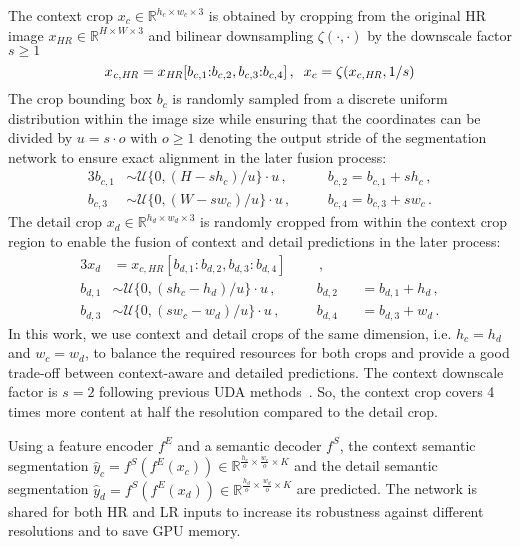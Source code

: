 \documentclass[journal,compsoc]{IEEEtran}
\begin{document}
The context crop $x_c \in \mathbb{R}^{h_c \times w_c \times 3}$ is obtained by cropping from the original HR image $x_\mathit{HR} \in \mathbb{R}^{H \times W \times 3}$ and bilinear downsampling $\zeta(\cdot, \cdot)$ by the downscale factor $s \geq 1$
\begin{equation}
    x_{\mathit{c,HR}} = x_\mathit{HR}[b_{c,1} {:} b_{c,2}, b_{c,3} {:} b_{c,4}]\,, \hspace{2mm} x_c = \zeta(x_{c,\mathit{HR}}, 1/s)
    \label{eq:x_c}
\end{equation}
The crop bounding box $b_c$ is randomly sampled from a discrete uniform distribution within the image size while ensuring that the coordinates can be divided by $u=s \cdot o$ with $o \geq 1$ denoting the output stride of the segmentation network to ensure exact alignment in the later fusion process:
\begin{alignat}{3}
    b_{c,1} &\sim \mathcal{U}\{0, (H-sh_c) / u\} \cdot u\,,\quad &&b_{c,2} = b_{c,1} + sh_c\,,\\ 
    b_{c,3} &\sim \mathcal{U}\{0, (W-sw_c) / u\} \cdot u\,,\quad &&b_{c,4} = b_{c,3} + sw_c\,.\nonumber
\end{alignat}
The detail crop $x_d \in \mathbb{R}^{h_d \times w_d \times 3}$ is randomly cropped from within the context crop region to enable the fusion of context and detail predictions in the later process:
\begin{alignat}{3}
    x_d &= x_\mathit{c,HR}[b_{d,1} : b_{d,2}, b_{d,3} : b_{d,4}] &&\,,\label{eq:x_d}\\
    b_{d,1} &\sim \mathcal{U}\{0, (sh_c-h_d) / u\} \cdot u\,,\quad &&b_{d,2} &&= b_{d,1} + h_d\,,\\ 
    b_{d,3} &\sim \mathcal{U}\{0, (sw_c-w_d) / u\} \cdot u\,,\quad &&b_{d,4} &&= b_{d,3} + w_d\,.\nonumber
\end{alignat}
In this work, we use context and detail crops of the same dimension, i.e. $h_c{=}h_d$ and $w_c{=}w_d$, to balance the required resources for both crops and provide a good trade-off between context-aware and detailed predictions. The context downscale factor is $s{=}2$ following previous UDA methods~\cite{tsai2018learning,tranheden2021dacs}. So, the context crop covers 4 times more content at half the resolution compared to the detail crop.

Using a feature encoder $f^E$ and a semantic decoder $f^S$, the context semantic segmentation $\hat{y}_c = f^S(f^E(x_c)) \in \mathbb{R}^{\frac{h_c}{o} \times \frac{w_c}{o} \times K}$ and the detail semantic segmentation $\hat{y}_d = f^S(f^E(x_d)) \in \mathbb{R}^{\frac{h_d}{o} \times \frac{w_d}{o} \times K}$ are predicted. 
The network is shared for both HR and LR inputs to increase its robustness against different resolutions and to save GPU memory.
\end{document}
